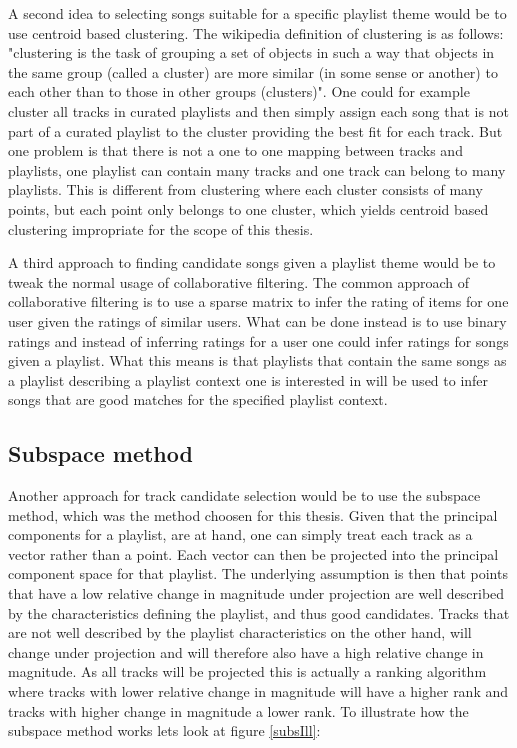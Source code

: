 \documentclass[a4paper,11pt]{kth-mag}
\begin{document}
A second idea to selecting songs suitable for a specific playlist theme would be to use centroid based clustering. The wikipedia definition of clustering is as follows: "clustering is the task of grouping a set of objects in such a way that objects in the same group (called a cluster) are more similar (in some sense or another) to each other than to those in other groups (clusters)". One could for example cluster all tracks in curated playlists and then simply assign each song that is not part of a curated playlist to the cluster providing the best fit for each track. But one problem is that there is not a one to one mapping between tracks and playlists, one playlist can contain many tracks and one track can belong to many playlists. This is different from clustering where each cluster consists of many points, but each point only belongs to one cluster, which yields centroid based clustering impropriate for the scope of this thesis. 

A third approach to finding candidate songs given a playlist theme would be to tweak the normal usage of collaborative filtering. The common approach of collaborative filtering is to use a sparse matrix to infer the rating of items for one user given the ratings of similar users. What can be done instead is to use binary ratings and instead of inferring ratings for a user one could infer ratings for songs given a playlist. What this means is that playlists that contain the same songs as a playlist describing a playlist context one is interested in will be used to infer songs that are good matches for the specified playlist context. 

\subsection{Subspace method}
Another approach for track candidate selection would be to use the subspace method, which was the method choosen for this thesis. Given that the principal components for a playlist, are at hand, one can simply treat each track as a vector rather than a point. Each vector can then be projected into the principal component space for that playlist. The underlying assumption is then that points that have a low relative change in magnitude under projection are well described by the characteristics defining the playlist, and thus good candidates. Tracks that are not well described by the playlist characteristics on the other hand, will change under projection and will therefore also have a high relative change in magnitude. As all tracks will be projected this is actually a ranking algorithm where tracks with lower relative change in magnitude will have a higher rank and tracks with higher change in magnitude a lower rank. To illustrate how the subspace method works lets look at figure \ref{subsIll}:
\end{document}

